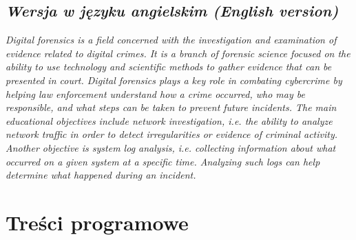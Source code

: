 \documentclass[12pt, a4paper]{article}
\begin{document}
\subsection*{\textit{Wersja w języku angielskim (English version)}}

\textit{Digital forensics is a field concerned with the investigation and examination of evidence related to digital crimes. It is a branch of forensic science focused on the ability to use technology and scientific methods to gather evidence that can be presented in court. Digital forensics plays a key role in combating cybercrime by helping law enforcement understand how a crime occurred, who may be responsible, and what steps can be taken to prevent future incidents. The main educational objectives include network investigation, i.e. the ability to analyze network traffic in order to detect irregularities or evidence of criminal activity. Another objective is system log analysis, i.e. collecting information about what occurred on a given system at a specific time. Analyzing such logs can help determine what happened during an incident.}


\section{Treści programowe}
\end{document}
